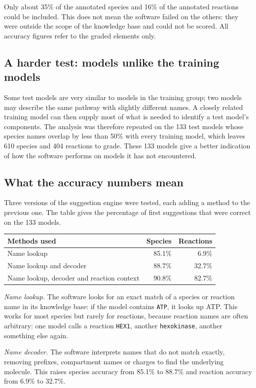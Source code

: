 \documentclass[10pt]{article}
\begin{document}
Only about 35\% of the annotated species and 16\% of the annotated reactions could be included. This does not
mean the software failed on the others: they were outside the scope of the knowledge base and could not be
scored. All accuracy figures refer to the graded elements only.

\subsection*{A harder test: models unlike the training models}
Some test models are very similar to models in the training group; two models may describe the same pathway
with slightly different names. A closely related training model can then supply most of what is needed to
identify a test model's components. The analysis was therefore repeated on the 133 test models whose species
names overlap by less than 50\% with every training model, which leaves 610 species and 404 reactions to grade.
These 133 models give a better indication of how the software performs on models it has not encountered.

\subsection*{What the accuracy numbers mean}
Three versions of the suggestion engine were tested, each adding a method to the previous one. The table gives
the percentage of first suggestions that were correct on the 133 models.

\begin{center}\small
\begin{tabular}{lrr}
\toprule
Methods used & Species & Reactions \\
\midrule
Name lookup & 85.1\% & 6.9\% \\
Name lookup and decoder & 88.7\% & 32.7\% \\
Name lookup, decoder and reaction context & 90.8\% & 82.7\% \\
\bottomrule
\end{tabular}
\end{center}

\emph{Name lookup.} The software looks for an exact match of a species or reaction name in its knowledge base:
if the model contains \texttt{ATP}, it looks up ATP. This works for most species but rarely for reactions,
because reaction names are often arbitrary: one model calls a reaction \texttt{HEX1}, another
\texttt{hexokinase}, another something else again.

\emph{Name decoder.} The software interprets names that do not match exactly, removing prefixes, compartment
names or charges to find the underlying molecule. This raises species accuracy from 85.1\% to 88.7\% and
reaction accuracy from 6.9\% to 32.7\%.
\end{document}
